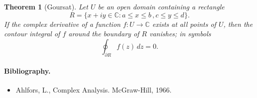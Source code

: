 \documentclass[12pt]{article}
\newcommand{\cnums}{\mathbb{C}}
\newtheorem{theorem}[proposition]{Theorem}
\begin{document}
\begin{theorem}[Goursat]
Let $U$ be an open domain containing a rectangle
$$R = \{ x+iy\in\cnums: a\leq x\leq b\,, c\leq y\leq d\}.$$
If the complex derivative of a function $f:U\rightarrow \cnums$ exists
at all points of $U$, then the contour integral of $f$ around the
boundary of $R$ vanishes; in symbols
$$\oint_{\partial R} f(z)\,dz = 0.$$
\end{theorem}

\paragraph{Bibliography.}
\begin{itemize}
\item  Ahlfors, L., Complex Analysis. McGraw-Hill, 1966.
\end{itemize}
\end{document}
